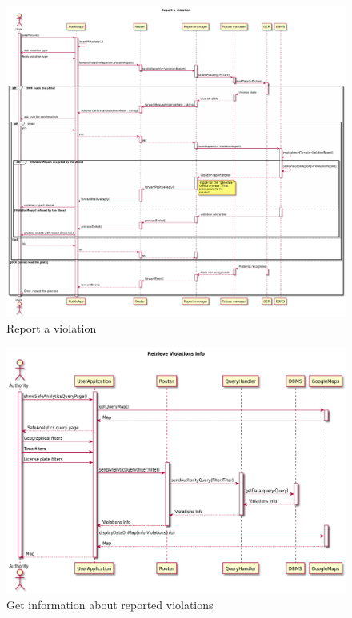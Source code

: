 \documentclass[./main.tex]{subfiles}
\begin{document}
\begin{figure}[H]
\centering
\includegraphics[width=\textwidth]{resources/sequence_diagrams/safereports}
\caption{Report a violation}
\end{figure}

\begin{figure}[H]
\centering
\includegraphics[width=\textwidth]{resources/sequence_diagrams/retrieve_violation_info}
\caption{Get information about reported violations}
\end{figure}
\end{document}
